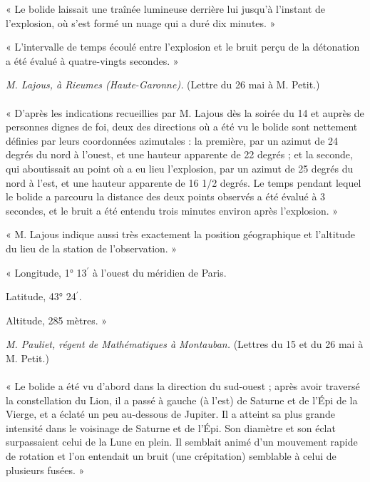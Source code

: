 \documentclass[a4paper, 11pt, oneside, polutonikogreek, french]{article}
\begin{document}
« Le bolide laissait une traînée lumineuse derrière lui jusqu'à l'instant de l'explosion, où s'est formé un nuage qui a duré dix minutes. »

« L'intervalle de temps écoulé entre l'explosion et le bruit perçu de la détonation a été évalué à quatre-vingts secondes. »
\begin{center}
\emph{M. Lajous, à Rieumes (Haute-Garonne).} (Lettre du 26 mai à M. Petit.)
\end{center}
\paragraph{}
« D'après les indications recueillies par M. Lajous dès la soirée du 14 et auprès de personnes dignes de foi, deux des directions où a été vu le bolide sont nettement définies par leurs coordonnées azimutales : la première, par un azimut de 24 degrés du nord à l'ouest, et une hauteur apparente de 22 degrés ; et la seconde, qui aboutissait au point où a eu lieu l'explosion, par un azimut de 25 degrés du nord à l'est, et une hauteur apparente de 16 1/2 degrés. Le temps pendant lequel le bolide a parcouru la distance des deux points observés a été évalué à 3 secondes, et le bruit a été entendu trois minutes environ après l'explosion. »

« M. Lajous indique aussi très exactement la position géographique et l'altitude du lieu de la station de l'observation. »
\begin{center}
« Longitude, 1° 13$^{\prime}$ à l'ouest du méridien de Paris.  

Latitude, 43° 24$^{\prime}$.

Altitude, 285 mètres. »
\end{center}
\begin{center}
\emph{M. Pauliet, régent de Mathématiques à Montauban.} (Lettres du 15 et du 26 mai à M. Petit.)
\end{center}
\paragraph{}
« Le bolide a été vu d'abord dans la direction du sud-ouest ; après avoir traversé la constellation du Lion, il a passé à gauche (à l'est) de Saturne et de l'Épi de la Vierge, et a éclaté un peu au-dessous de Jupiter. Il a atteint sa plus grande intensité dans le voisinage de Saturne et de l'Épi. Son diamètre et son éclat surpassaient celui de la Lune en plein. Il semblait animé d'un mouvement rapide de rotation et l'on entendait un bruit (une crépitation) semblable à celui de plusieurs fusées. »
\end{document}
